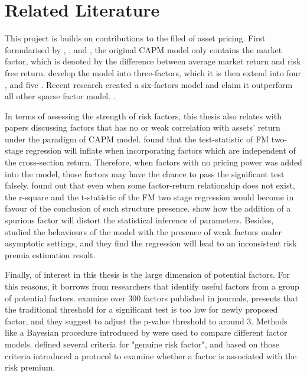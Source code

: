 	\section{Related Literature}

This project is builds on contributions to the filed of asset pricing.
First formularised by , , and , the original CAPM model only contains the market factor, which is denoted by the difference between average market return and risk free return.
 develop the model into three-factors, which it is then extend into four \cite{Carhart1997}, and five \cite{Fama2015}.
Recent research created a six-factors model and claim it outperform all other sparse factor model. \cite{Kelly2019}.

In terms of assessing the strength of risk factors, this thesis also relates with papers discussing factors that has no or weak correlation with assets' return under the paradigm of CAPM model.
 found that the test-statistic of FM two-stage regression  \cite{Fama1973} will inflate when incorporating factors which are independent of the cross-section return.
Therefore, when factors with no pricing power was added into the model, those factors may have the chance to pass the significant test falsely.
 found out that even when some factor-return relationship does not exist, the r-square and the t-statistic of the FM two stage regression would become in favour of the conclusion of such structure presence. 
 show how the addition of a spurious factor will distort the statistical inference of parameters.
Besides,  studied the behaviours of the model with the presence of weak factors under asymptotic settings, and they find the regression will lead to an inconsistent risk premia estimation result.
	
	
	Finally, of interest in this thesis is the large dimension of potential factors.
	For this reasons, it borrows from researchers that identify useful factors from a group of potential factors.
 examine over 300 factors published in journals, presents that the traditional threshold for a significant test is too low for newly proposed factor, and they suggest to adjust the p-value threshold to around 3. 
Methods like a Bayesian procedure introduced by  were used to compare different factor models.
 defined several criteria for "genuine risk factor", and based on those criteria introduced a protocol to examine whether a factor is associated with the risk premium.

